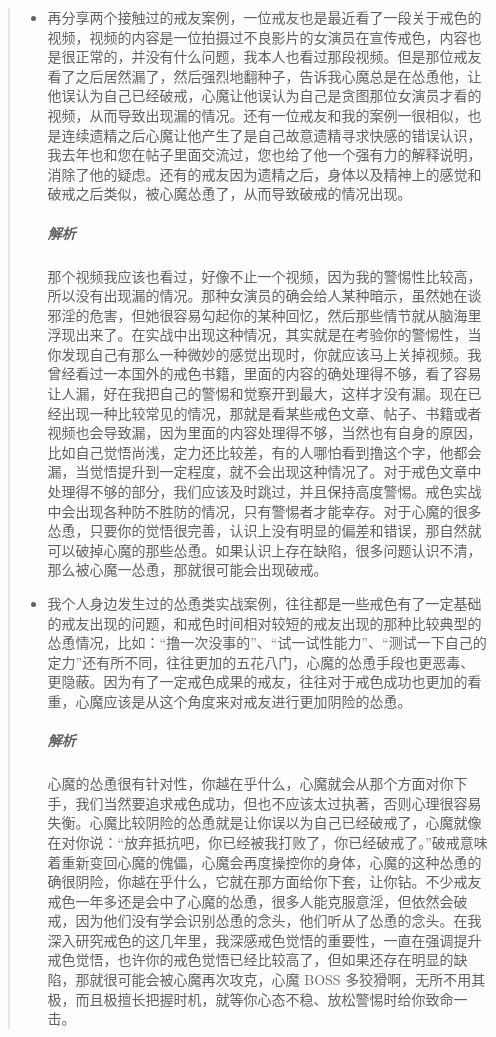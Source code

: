 \begin{quotation}
\begin{itemize}
        \item 再分享两个接触过的戒友案例，一位戒友也是最近看了一段关于戒色的视频，视频的内容是一位拍摄过不良影片的女演员在宣传戒色，内容也是很正常的，并没有什么问题，我本人也看过那段视频。但是那位戒友看了之后居然漏了，然后强烈地翻种子，告诉我心魔总是在怂恿他，让他误认为自己已经破戒，心魔让他误认为自己是贪图那位女演员才看的视频，从而导致出现漏的情况。还有一位戒友和我的案例一很相似，也是连续遗精之后心魔让他产生了是自己故意遗精寻求快感的错误认识，我去年也和您在帖子里面交流过，您也给了他一个强有力的解释说明，消除了他的疑虑。还有的戒友因为遗精之后，身体以及精神上的感觉和破戒之后类似，被心魔怂恿了，从而导致破戒的情况出现。\subparagraph{解析} 那个视频我应该也看过，好像不止一个视频，因为我的警惕性比较高，所以没有出现漏的情况。那种女演员的确会给人某种暗示，虽然她在谈邪淫的危害，但她很容易勾起你的某种回忆，然后那些情节就从脑海里浮现出来了。在实战中出现这种情况，其实就是在考验你的警惕性，当你发现自己有那么一种微妙的感觉出现时，你就应该马上关掉视频。我曾经看过一本国外的戒色书籍，里面的内容的确处理得不够，看了容易让人漏，好在我把自己的警惕和觉察开到最大，这样才没有漏。现在已经出现一种比较常见的情况，那就是看某些戒色文章、帖子、书籍或者视频也会导致漏，因为里面的内容处理得不够，当然也有自身的原因，比如自己觉悟尚浅，定力还比较差，有的人哪怕看到撸这个字，他都会漏，当觉悟提升到一定程度，就不会出现这种情况了。对于戒色文章中处理得不够的部分，我们应该及时跳过，并且保持高度警惕。戒色实战中会出现各种防不胜防的情况，只有警惕者才能幸存。对于心魔的很多怂恿，只要你的觉悟很完善，认识上没有明显的偏差和错误，那自然就可以破掉心魔的那些怂恿。如果认识上存在缺陷，很多问题认识不清，那么被心魔一怂恿，那就很可能会出现破戒。
        \item 我个人身边发生过的怂恿类实战案例，往往都是一些戒色有了一定基础的戒友出现的问题，和戒色时间相对较短的戒友出现的那种比较典型的怂恿情况，比如：“撸一次没事的”、“试一试性能力”、“测试一下自己的定力”还有所不同，往往更加的五花八门，心魔的怂恿手段也更恶毒、更隐蔽。因为有了一定戒色成果的戒友，往往对于戒色成功也更加的看重，心魔应该是从这个角度来对戒友进行更加阴险的怂恿。\subparagraph{解析} 心魔的怂恿很有针对性，你越在乎什么，心魔就会从那个方面对你下手，我们当然要追求戒色成功，但也不应该太过执著，否则心理很容易失衡。心魔比较阴险的怂恿就是让你误以为自己已经破戒了，心魔就像在对你说：“放弃抵抗吧，你已经被我打败了，你已经破戒了。”破戒意味着重新变回心魔的傀儡，心魔会再度操控你的身体，心魔的这种怂恿的确很阴险，你越在乎什么，它就在那方面给你下套，让你钻。不少戒友戒色一年多还是会中了心魔的怂恿，很多人能克服意淫，但依然会破戒，因为他们没有学会识别怂恿的念头，他们听从了怂恿的念头。在我深入研究戒色的这几年里，我深感戒色觉悟的重要性，一直在强调提升戒色觉悟，也许你的戒色觉悟已经比较高了，但如果还存在明显的缺陷，那就很可能会被心魔再次攻克，心魔 BOSS 多狡猾啊，无所不用其极，而且极擅长把握时机，就等你心态不稳、放松警惕时给你致命一击。

\end{itemize}
\end{quotation}
